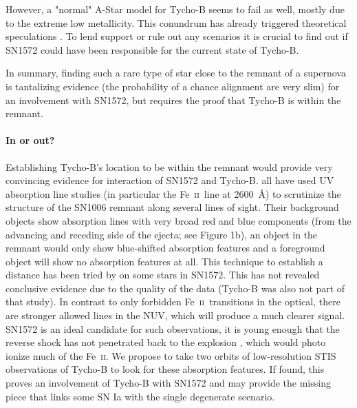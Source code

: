 \documentclass[12pt]{article}
\newcommand{\feii}{Fe~\textsc{ii}}
\begin{document}
However, a "normal" A-Star model for Tycho-B seems to fail as well, mostly due to the extreme low metallicity. This conundrum has already triggered theoretical speculations \citep[e.g.][]{2012arXiv1212.2662T}. To lend support or rule out any scenarios it is crucial to find out if SN1572 could have been responsible for the current state of Tycho-B.

In summary, finding such a rare type of star close to the remnant of a supernova is tantalizing evidence (the probability of a chance alignment are very slim) for an involvement with SN1572, but requires the proof that Tycho-B is within the remnant.

\vspace{-5mm}
\paragraph{In or out?}
Establishing Tycho-B's location to be within the remnant would provide very convincing evidence for interaction of SN1572 and Tycho-B. 
\cite{1988ApJ...327..164F,1993ApJ...416..247W, 2005ApJ...624..189W} all have used UV absorption line studies (in particular the \feii\ line at 2600~\AA) to scrutinize the structure of the SN1006 remnant along several lines of sight. Their background objects show absorption lines with very broad red and blue components (from the advancing and receding side of the ejecta; see Figure 1b), an object in the remnant would only show blue-shifted absorption features and a foreground object will show no absorption features at all. This technique to establish a distance has been tried by \citet{2007PASJ...59..811I} on some stars in SN1572. This has not revealed conclusive evidence due to the quality of the data (Tycho-B was also not part of that study). In contrast to only forbidden \feii\ transitions in the optical, there are stronger allowed lines in the NUV, which will produce a much clearer signal. SN1572 is an ideal candidate for such observations, it is young enough that the reverse shock has not penetrated back to the explosion \citep[current radius 183\arcsec;][]{2005ApJ...634..376W}, which would photo ionize much of the \feii. We propose to take two orbits of low-resolution STIS observations of Tycho-B to look for these absorption features. If found,  this proves an involvement of Tycho-B with SN1572 and may provide the missing piece that links some SN Ia with the single degenerate scenario.
\end{document}
